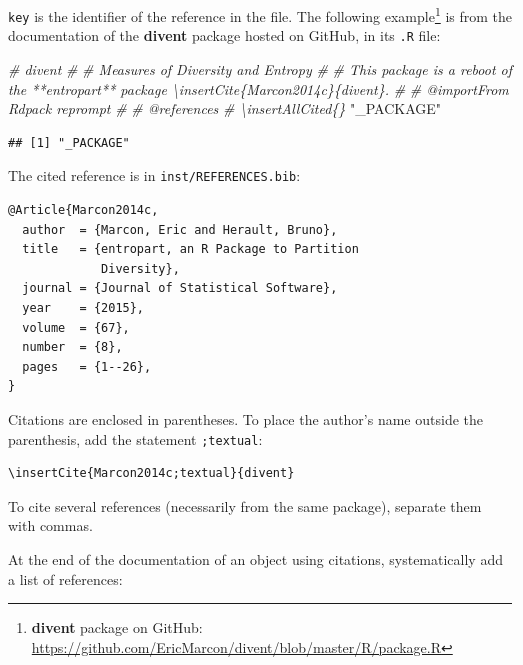 \documentclass[
  12pt,
  american,
  a4paper,
  extrafontsizes,onecolumn,openright
  ]{memoir}
\newenvironment{Shaded}{\begin{snugshade}}{\end{snugshade}}
\newcommand{\CommentTok}[1]{\textcolor[rgb]{0.56,0.35,0.01}{\textit{#1}}}
\newcommand{\StringTok}[1]{\textcolor[rgb]{0.31,0.60,0.02}{#1}}
\begin{document}
\texttt{key} is the identifier of the reference in the file.
The following example\footnote{\textbf{divent} package on GitHub: \url{https://github.com/EricMarcon/divent/blob/master/R/package.R}} is from the documentation of the \textbf{divent} package hosted on GitHub, in its \texttt{.R} file:

\scriptsize

\begin{Shaded}
\begin{Highlighting}[]
\CommentTok{\#\textquotesingle{} divent}
\CommentTok{\#\textquotesingle{}}
\CommentTok{\#\textquotesingle{} Measures of Diversity and Entropy}
\CommentTok{\#\textquotesingle{} }
\CommentTok{\#\textquotesingle{} This package is a reboot of the **entropart** package \textbackslash{}insertCite\{Marcon2014c\}\{divent\}.}
\CommentTok{\#\textquotesingle{}}
\CommentTok{\#\textquotesingle{} @importFrom Rdpack reprompt}
\CommentTok{\#\textquotesingle{} }
\CommentTok{\#\textquotesingle{} @references}
\CommentTok{\#\textquotesingle{} \textbackslash{}insertAllCited\{\}}
\StringTok{"\_PACKAGE"}
\end{Highlighting}
\end{Shaded}

\begin{verbatim}
## [1] "_PACKAGE"
\end{verbatim}

\normalsize

The cited reference is in \texttt{inst/REFERENCES.bib}:

\begin{verbatim}
@Article{Marcon2014c,
  author  = {Marcon, Eric and Herault, Bruno},
  title   = {entropart, an R Package to Partition 
             Diversity},
  journal = {Journal of Statistical Software},
  year    = {2015},
  volume  = {67},
  number  = {8},
  pages   = {1--26},
}
\end{verbatim}

Citations are enclosed in parentheses.
To place the author's name outside the parenthesis, add the statement \texttt{;textual}:

\begin{verbatim}
\insertCite{Marcon2014c;textual}{divent}
\end{verbatim}

To cite several references (necessarily from the same package), separate them with commas.

At the end of the documentation of an object using citations, systematically add a list of references:
\end{document}
